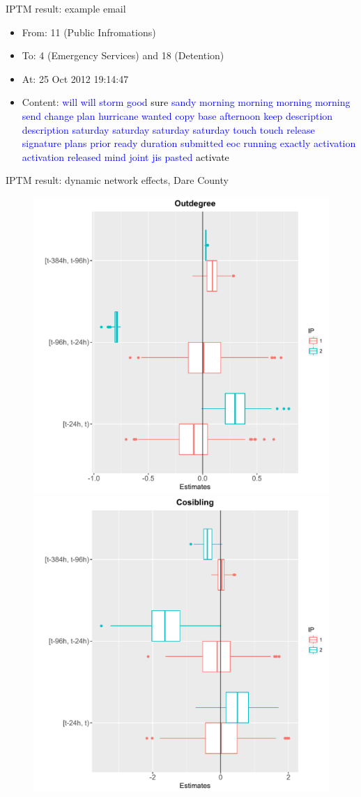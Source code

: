 \documentclass[10pt, xcolor=table]{beamer}
\theoremstyle{definition}
\theoremstyle{remark}
\newenvironment{changemargin}[2]{%
  \begin{list}{}{%
    \setlength{\topsep}{0pt}%
    \setlength{\leftmargin}{#1}%
    \setlength{\rightmargin}{#2}%
    \setlength{\listparindent}{\parindent}%
    \setlength{\itemindent}{\parindent}%
    \setlength{\parsep}{\parskip}%
  }%
  \item[]}{\end{list}}
\begin{document}
\begin{frame}{IPTM result: example email}
\begin{itemize}
	\item From: 11 (Public Infromations)\\
	\item To: 4 (Emergency Services) and 18 (Detention)\\	 
	\item At: 25 Oct 2012 19:14:47\\
	\item Content:
\textcolor{blue}{ will will storm good \textcolor{black}{sure} sandy morning morning morning morning send change plan hurricane wanted copy base afternoon keep description description saturday saturday saturday saturday touch touch release signature plans prior ready duration submitted eoc running exactly activation activation released mind joint jis pasted \textcolor{black}{activate}}
	\end{itemize}
\end{frame}


\begin{frame}{IPTM result: dynamic network effects, Dare County}
\begin{changemargin}{-1cm}{-1cm}
	\begin{figure}
		\includegraphics[width=.55\textwidth]{figures/outdegree.pdf} \includegraphics[width=.55\textwidth]{figures/cosibling.pdf}
			\end{figure}
	\end{changemargin}
\end{frame}
\end{document}
